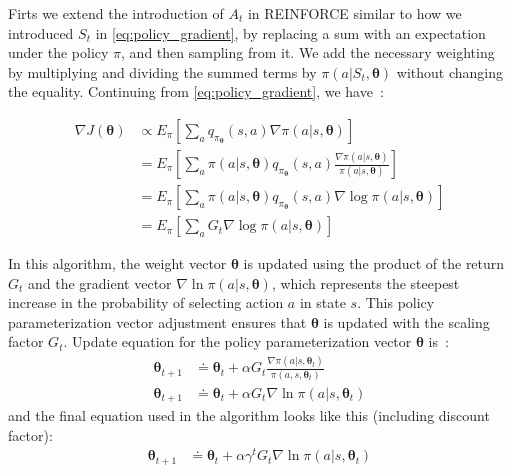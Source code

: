 \documentclass[../xlapes02]{subfiles}
\begin{document}
    Firts we extend the introduction of $A_t$ in REINFORCE similar to how we introduced $S_t$ in \cref{eq:policy_gradient}, by replacing a sum with an expectation under the policy $\pi$, and then sampling from it. We add the necessary weighting by multiplying and dividing the summed terms by $\pi(a|S_t, \bm{\theta})$ without changing the equality. Continuing from \cref{eq:policy_gradient}, we have~\cite{sutton2018reinforcement, rl-course-david-silver}:

    \begin{equation}
        \label{eq:policy_gradient_2}
        \begin{split}
            \nabla J(\bm{\theta})&\propto E_{\pi}\left[\sum_{a}q_{\pi_{\bm{\theta}}}(s,a)\nabla\pi(a|s,\bm{\theta})\right]\\
            &=E_{\pi}\left[\sum_{a}\pi(a|s,\bm{\theta})q_{\pi_{\bm{\theta}}}(s,a)\frac{\nabla\pi(a|s,\bm{\theta})}{\pi(a|s,\bm{\theta})}\right]\\
            &=E_{\pi}\left[\sum_{a}\pi(a|s,\bm{\theta})q_{\pi_{\bm{\theta}}}(s,a)\nabla\log\pi(a|s,\bm{\theta})\right]\\
            &=E_{\pi}\left[\sum_{a}G_t\nabla\log\pi(a|s,\bm{\theta})\right]
        \end{split}
    \end{equation}

    In this algorithm, the weight vector $\bm{\theta}$ is updated using the product of the return $G_t$ and the gradient vector $\nabla \ln \pi(a | s, \bm{\theta})$, which represents the steepest increase in the probability of selecting action $a$ in state $s$. This policy parameterization vector adjustment ensures that $\bm{\theta}$ is updated with the scaling factor $G_t$. Update equation for the policy parameterization vector $\bm{\theta}$ is~\cite{FITMT25127, sutton2018reinforcement, rl-course-david-silver}:
    \begin{equation}
        \begin{split}
            \bm{\theta}_{t+1}&\doteq\bm{\theta}_{t}+\alpha G_t \frac{\nabla\pi(a|s,\bm{\theta}_t)}{\pi(a,s,\bm{\theta}_t)}\\
            \bm{\theta}_{t+1}&\doteq\bm{\theta}_{t}+\alpha G_t \nabla\ln\pi(a|s,\bm{\theta}_t)
        \end{split}
    \end{equation}
    and the final equation used in the algorithm looks like this (including discount factor):
    \begin{equation}
        \begin{split}
            \bm{\theta}_{t+1}&\doteq\bm{\theta}_{t}+\alpha\gamma^t G_t \nabla\ln\pi(a|s,\bm{\theta}_t)
        \end{split}
        \label{eq:REINFORCE}
    \end{equation}
\end{document}
